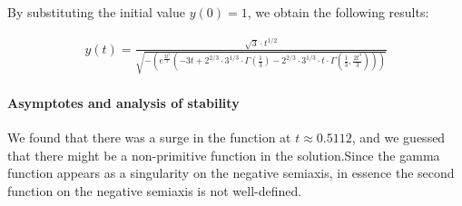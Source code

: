 \documentclass{article}
\begin{document}
By substituting the initial value \( y(0) = 1 \), we obtain the following results:

\begin{multline}
y(t) = \frac{\sqrt{3} \cdot t^{1/2}}{\sqrt{-\left( e^{\frac{2t^3}{3}} \left( -3t + 2^{2/3} \cdot 3^{1/3} \cdot \Gamma \left( \frac{1}{3} \right) - 2^{2/3} \cdot 3^{1/3} \cdot t \cdot \Gamma \left( \frac{1}{3}, \frac{2t^3}{3} \right) \right) \right)}}
\end{multline}

\paragraph{Asymptotes and analysis of stability}
We found that there was a surge in the function at \( t \approx 0.5112 \), and we guessed that there might be a non-primitive function in the solution.Since the gamma function appears as a singularity on the negative semiaxis, in essence the second function on the negative semiaxis is not well-defined.
\end{document}
